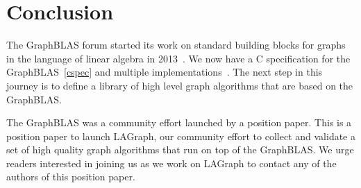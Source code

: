 \section{Conclusion}
\label{sec:conclusion}

The GraphBLAS forum started its work on standard building blocks for 
graphs in the language of linear algebra in 2013~\cite{hpec13}.  We now
have a C specification for the GraphBLAS~\ref{cspec} and multiple 
implementations~\cite{suiteSparse, ibmGraphBLAS}.   The next 
step in this journey is to define a library of high level graph algorithms
that are based on the GraphBLAS.  

The GraphBLAS was a community effort launched by a position paper.
This is a position paper to launch LAGraph, our community effort to 
collect and validate a set of high quality graph algorithms that run 
on top of the GraphBLAS. We urge readers interested in joining us as we
work on LAGraph to contact any of the authors of this position paper.